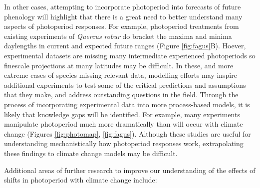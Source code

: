 \documentclass{article}
\begin{document}
\par In other cases, attempting to incorporate photoperiod into forecasts of future phenology will highlight that there is a great need to better understand many aspects of photoperiod responses. For example, photoperiod treatments from  existing experiments of \emph{Quercus robur} do bracket the maxima and minima daylengths in current and expected future ranges (Figure \ref{fig:fagus}B). Hoever, experimental datasets are missing many intermediate experienced photoperiods so finescale projections at many latitudes may be difficult. In these, and more extreme cases of species missing relevant data, modelling efforts may inspire additional experiments to test some of the critical predictions and assumptions that they make, and address outstanding questions in the field. Through the process of incorporating experimental data into more process-based models, it is likely that knowledge gaps will be identified. For example, many experiments manipulate photoperiod much more dramatically than will occur with climate change (Figures \ref{fig:photomap}, \ref{fig:fagus}). Although these studies are useful for understanding mechanistically how photoperiod responses work, extrapolating these findings to climate change models may be difficult. %
\par Additional areas of further research to improve our understanding of the effects of shifts in photoperiod with climate change include:
\end{document}
